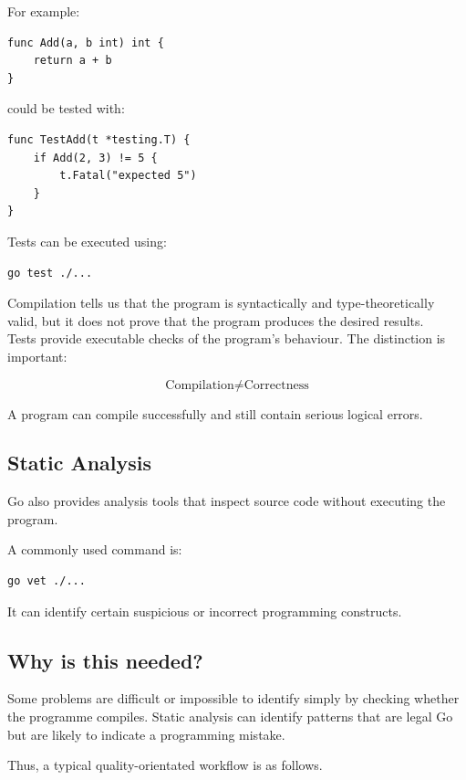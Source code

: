 For example:

\begin{lstlisting}
func Add(a, b int) int {
    return a + b
}
\end{lstlisting}

could be tested with:

\begin{lstlisting}
func TestAdd(t *testing.T) {
    if Add(2, 3) != 5 {
        t.Fatal("expected 5")
    }
}
\end{lstlisting}

Tests can be executed using:

\begin{lstlisting}
go test ./...
\end{lstlisting}

Compilation tells us that the program is syntactically and
type-theoretically valid, but it does not prove that the program
produces the desired results.\\

Tests provide executable checks of the program's behaviour. The distinction is important:

\[
\text{Compilation} \neq \text{Correctness}
\]

A program can compile successfully and still contain serious logical
errors.

\subsection{Static Analysis}

Go also provides analysis tools that inspect source code without
executing the program.

A commonly used command is:

\begin{lstlisting}
go vet ./...
\end{lstlisting}

It can identify certain suspicious or incorrect programming constructs.

\subsection*{Why is this needed?}

Some problems are difficult or impossible to identify simply by
checking whether the programme compiles.  Static analysis can identify
patterns that are legal Go but are likely to indicate a programming
mistake.

Thus, a typical quality-orientated workflow is as follows.

